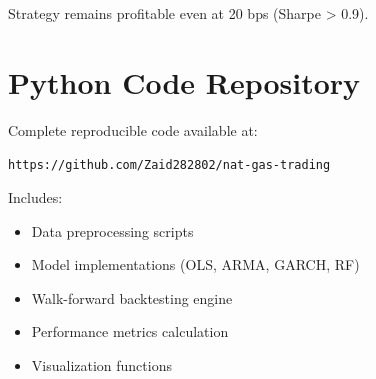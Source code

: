 \documentclass[12pt,a4paper]{article}
\begin{document}
Strategy remains profitable even at 20 bps (Sharpe > 0.9).

\section{Python Code Repository}

Complete reproducible code available at:

\texttt{https://github.com/Zaid282802/nat-gas-trading}

Includes:
\begin{itemize}
    \item Data preprocessing scripts
    \item Model implementations (OLS, ARMA, GARCH, RF)
    \item Walk-forward backtesting engine
    \item Performance metrics calculation
    \item Visualization functions
\end{itemize}
\end{document}
